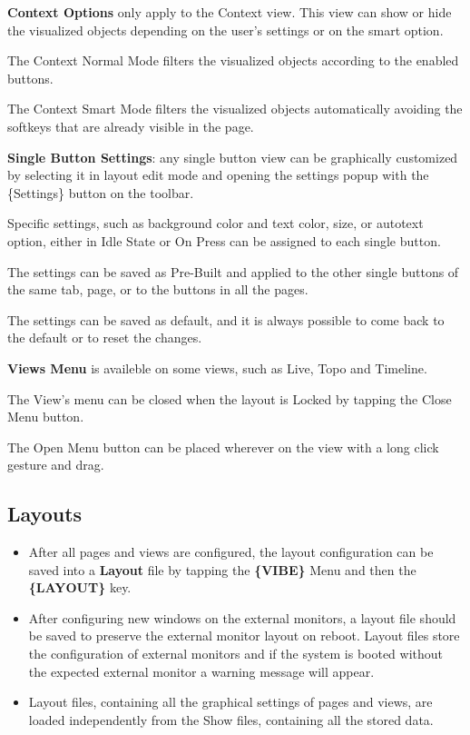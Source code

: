 \documentclass[
]{article}
\begin{document}
\textbf{Context Options} only apply to the Context view. This view can show or hide the visualized objects depending on the user's settings or on the smart option.

The Context Normal Mode filters the visualized objects according to the enabled buttons.

The Context Smart Mode filters the visualized objects automatically avoiding the softkeys that are already visible in the page.

\textbf{Single Button Settings}: any single button view can be graphically customized by selecting it in layout edit mode and opening the settings popup with the \{Settings\} button on the toolbar.

Specific settings, such as background color and text color, size, or autotext option, either in Idle State or On Press can be assigned to each single button.

The settings can be saved as Pre-Built and applied to the other single buttons of the same tab, page, or to the buttons in all the pages.

The settings can be saved as default, and it is always possible to come back to the default or to reset the changes.

\textbf{Views Menu} is availeble on some views, such as Live, Topo and Timeline.

The View's menu can be closed when the layout is Locked by tapping the Close Menu button.

The Open Menu button can be placed wherever on the view with a long click gesture and drag.

\hypertarget{Layouts-3.5}{%
\subsection{Layouts}\label{Layouts-3.5}}

\begin{itemize}
\item
  After all pages and views are configured, the layout configuration can be saved into a \textbf{Layout} file by tapping the \textbf{\{VIBE\}} Menu and then the \textbf{\{LAYOUT\}} key.
\item
  After configuring new windows on the external monitors, a layout file should be saved to preserve the external monitor layout on reboot. Layout files store the configuration of external monitors and if the system is booted without the expected external monitor a warning message will appear.
\item
  Layout files, containing all the graphical settings of pages and views, are loaded independently from the Show files, containing all the stored data.
\end{itemize}
\end{document}
